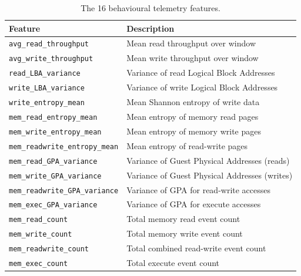 \documentclass[12pt,a4paper]{article}
\begin{document}
\begin{table}[H]
\centering
\caption{The 16 behavioural telemetry features.}
\begin{tabular}{ll}
\toprule
\textbf{Feature} & \textbf{Description} \\
\midrule
\texttt{avg\_read\_throughput}       & Mean read throughput over window \\
\texttt{avg\_write\_throughput}      & Mean write throughput over window \\
\texttt{read\_LBA\_variance}         & Variance of read Logical Block Addresses \\
\texttt{write\_LBA\_variance}        & Variance of write Logical Block Addresses \\
\texttt{write\_entropy\_mean}        & Mean Shannon entropy of write data \\
\texttt{mem\_read\_entropy\_mean}    & Mean entropy of memory read pages \\
\texttt{mem\_write\_entropy\_mean}   & Mean entropy of memory write pages \\
\texttt{mem\_readwrite\_entropy\_mean} & Mean entropy of read-write pages \\
\texttt{mem\_read\_GPA\_variance}    & Variance of Guest Physical Addresses (reads) \\
\texttt{mem\_write\_GPA\_variance}   & Variance of Guest Physical Addresses (writes) \\
\texttt{mem\_readwrite\_GPA\_variance} & Variance of GPA for read-write accesses \\
\texttt{mem\_exec\_GPA\_variance}    & Variance of GPA for execute accesses \\
\texttt{mem\_read\_count}            & Total memory read event count \\
\texttt{mem\_write\_count}           & Total memory write event count \\
\texttt{mem\_readwrite\_count}       & Total combined read-write event count \\
\texttt{mem\_exec\_count}            & Total execute event count \\
\bottomrule
\end{tabular}
\end{table}
\end{document}
